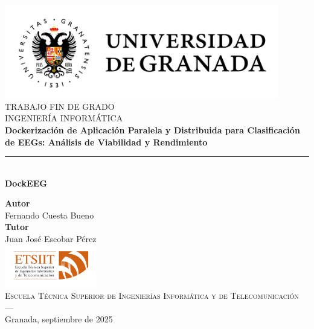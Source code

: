 \begin{titlepage}


    \newlength{\centeroffset}
    \setlength{\centeroffset}{-0.5\oddsidemargin}
    \addtolength{\centeroffset}{0.5\evensidemargin}
    \thispagestyle{empty}

    \noindent\hspace*{\centeroffset}\begin{minipage}{\textwidth}

        \centering
        \includegraphics[width=0.9\textwidth]{imagenes/logo_ugr.jpg}\\[1.2cm]

        \textsc{ \Large TRABAJO FIN DE GRADO\\[0.2cm]}
        \textsc{INGENIERÍA INFORMÁTICA}\\[1cm]
        {\Huge\bfseries Dockerización de Aplicación Paralela y Distribuida para Clasificación de EEGs: Análisis de Viabilidad y Rendimiento\\
        }
        \noindent\rule[-1ex]{\textwidth}{3pt}\\[3.5ex]
        {\large\bfseries DockEEG}
    \end{minipage}

    \vspace{2.5cm}
    \noindent\hspace*{\centeroffset}\begin{minipage}{\textwidth}
        \centering

        \textbf{Autor}\\ {Fernando Cuesta Bueno}\\[2.5ex]
        \textbf{Tutor}\\
        {Juan José Escobar Pérez}\\[2cm]
        \includegraphics[width=0.3\textwidth]{imagenes/etsiit_logo.png}\\[0.1cm]
        \textsc{Escuela Técnica Superior de Ingenierías Informática y de Telecomunicación}\\
        \textsc{---}\\
        Granada, septiembre de 2025
    \end{minipage}
\end{titlepage}


